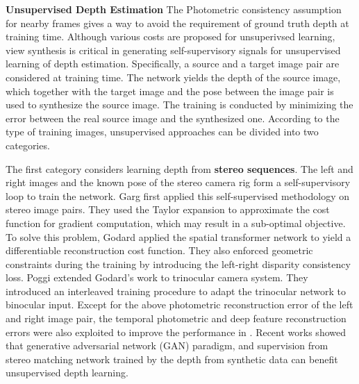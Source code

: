 \documentclass[10pt,twocolumn,letterpaper]{article}
\begin{document}
\noindent
\textbf{Unsupervised Depth Estimation} The Photometric consistency assumption for nearby frames gives a way to avoid the requirement of ground truth depth at training time. Although various costs are proposed for unsuperivsed learning, view synthesis \cite{flynn2016deepstereo,xie2016deep3d}  is critical in generating self-supervisory signals for unsupervised learning of depth estimation. Specifically, a source and a target image pair are considered at training time. The network yields the depth of the source image, which together with the target image and the pose between the image pair is used to synthesize the source image. The training is conducted by minimizing the  error between the real source image and the synthesized one.  According to the type of training images, unsupervised approaches can be divided into two categories. 

The first category considers learning depth from  \textbf{stereo sequences}.   The left and right images and the known pose of the stereo camera rig form a self-supervisory loop to train the network. Garg \etal \cite{garg2016unsupervised} first applied this self-supervised methodology on stereo image pairs. They used the Taylor expansion to approximate the cost function for gradient computation, which may result in a sub-optimal objective. To solve this problem, Godard \etal \cite{godard2017unsupervised} applied the spatial transformer network \cite{jaderberg2015spatial} to yield a differentiable reconstruction cost function. They also enforced geometric constraints during the training by introducing the left-right disparity  consistency loss. Poggi \etal \cite{poggi2018learning} extended Godard's work \cite{garg2016unsupervised} to trinocular camera system. They introduced an interleaved training procedure to adapt the trinocular network to binocular input.  Except for the above  photometric reconstruction error of the left and right image pair, the temporal  photometric and deep feature reconstruction errors were also exploited to improve the performance in \cite{zhan2018unsupervised}. Recent works \cite{pilzer2018unsupervised,aleotti2018generative} showed that  generative adversarial network (GAN) \cite{radford2015unsupervised} paradigm, and supervision from stereo matching network trained by the
depth from synthetic data \cite{guo2018learning} can benefit unsupervised depth learning.
\end{document}
